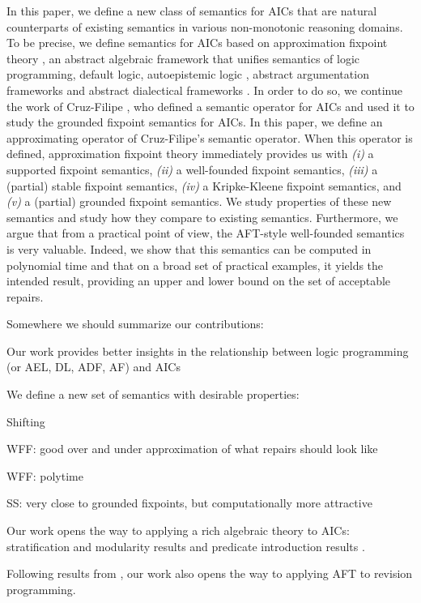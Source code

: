 In this paper, we define a new class of semantics for AICs that are natural counterparts of existing semantics in  various non-monotonic reasoning domains. 
To be precise, we define semantics for AICs based on approximation fixpoint theory , an abstract algebraic framework that unifies semantics of logic programming, default logic, autoepistemic logic , abstract argumentation frameworks  and abstract dialectical frameworks . 
In order to do so, we continue the work of Cruz-Filipe \cite{iclp/Cruz-Filipe16}, who defined a semantic operator for AICs and used it to study the grounded fixpoint semantics  for AICs. 
In this paper, we define an approximating operator of Cruz-Filipe's semantic operator. 
When this operator is defined, approximation fixpoint theory immediately provides us with \textit{(i)} a supported fixpoint semantics, \textit{(ii)} a well-founded fixpoint semantics, \textit{(iii)} a (partial) stable fixpoint semantics, \textit{(iv)} a Kripke-Kleene fixpoint semantics, and \textit{(v)} a (partial) grounded fixpoint semantics. 
We study properties of these new semantics and study how they compare to existing semantics. 
Furthermore, we argue that from a practical point of view, the AFT-style well-founded semantics is very valuable. 
Indeed, we show that this semantics can be computed in polynomial time and that on a broad set of practical examples, it yields the intended result, providing an upper and lower bound on the set of acceptable repairs.  

Somewhere we should summarize our contributions:
\begin{compactitem}
 \item Our work provides better insights in the relationship between logic programming (or AEL, DL, ADF, AF) and AICs
\item We define a new set of semantics with desirable properties:
\begin{compactitem}
\item  Shifting
 \item WFF: good over and under approximation of what repairs should look like
 \item WFF: polytime
 \item SS: very close to grounded fixpoints, but computationally more attractive
\end{compactitem}
\item Our work opens the way to applying a rich algebraic theory to AICs: stratification and modularity results \cite{tocl/VennekensGD06,tocl/BogaertsVD16} and predicate introduction results \cite{VennekensMWD07a,VennekensMWD07b}. 
\item Following results from \citet{tplp/CaropreseT11}, our work also opens the way to applying AFT to revision programming. 
\end{compactitem}
 
